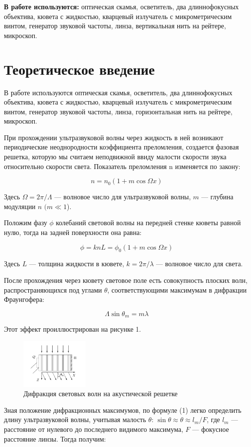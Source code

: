 \documentclass[a4paper,12pt]{article} %
\begin{document}
	\textbf{В работе используются:} оптическая скамья, осветитель, два длиннофокусных объектива, кювета с жидкостью, кварцевый излучатель с микрометрическим винтом, генератор звуковой частоты, линза, вертикальная нить на рейтере, микроскоп.
	
	\section{Теоретическое введение}
	
	В работе используются оптическая скамья, осветитель, два длиннофокусных объектива, кювета с жидкостью, кварцевый излучатель с микрометрическим винтом, генератор звуковой частоты, линза, горизонтальная нить на рейтере, микроскоп. 
	
	При прохождении ультразвуковой волны через жидкость в ней возникают периодические неоднородности коэффициента преломления, создается фазовая решетка, которую мы считаем неподвижной ввиду малости скорости звука относительно скорости света. Показатель
	преломления n изменяется по закону:
	
	\begin{equation}\label{}
	n = n_0 (1 + m \cos \Omega x)
	\end{equation}
	
	Здесь $ \Omega = 2 \pi / \Lambda $ --- волновое число для ультразвуковой волны, $ m $ --- глубина модуляции $ n $ $ (m \ll 1 $).
	
	Положим фазу $ \phi $ колебаний световой волны на передней стенке кюветы равной нулю, тогда на задней поверхности она равна:
	
	\begin{equation}\label{}
	\phi  = k n L = \phi_0 (1 + m \cos \Omega x)
	\end{equation}
	
	Здесь $ L $ --- толщина жидкости в кювете, $ k = 2 \pi / \lambda $ --- волновое число для света.
	
	После прохождения через кювету световое поле есть совокупность плоских волн, распространяющихся под углами $ \theta $, соответствующими максимумам в дифракции Фраунгофера:
	
\begin{equation}\label{}	
	\Lambda \sin \theta_m = m \lambda
\end{equation}

	Этот эффект проиллюстрирован на рисунке 1.
	\begin{figure}[h!]
		\centering	
		\includegraphics[width=0.3\textwidth]{wave.png}
		\caption{Дифракция световых волн на акустической решетке}
		\label{diff}
	\end{figure}
    Зная положение дифракционных максимумов, по формуле (1) легко определить длину ультразвуковой волны, учитывая малость $ \theta $: $ \sin \theta \approx \theta \approx l_m /F  $, где $ l_m $ --- расстояние от нулевого до последнего видимого максимума, $ F $ --- фокусное расстояние линзы. Тогда получим:
    	
\end{document}

